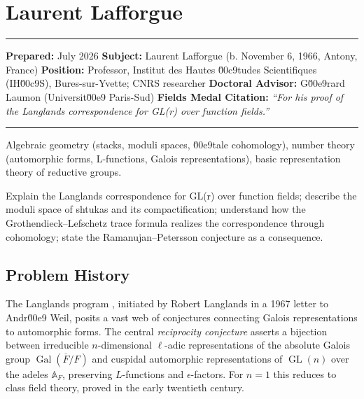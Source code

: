 \chapter{Laurent Lafforgue}\label{ch2002laurentlafforgue:laurent-lafforgue-fields-medal-2002-a-comprehensive-report-on-his-work-and-impact}

\begin{center}\rule{0.5\linewidth}{0.5pt}\end{center}

\textbf{Prepared:} July 2026 \textbf{Subject:} Laurent Lafforgue (b. November 6, 1966, Antony, France) \textbf{Position:} Professor, Institut des Hautes \u00c9tudes Scientifiques (IH\u00c9S), Bures-sur-Yvette; CNRS researcher \textbf{Doctoral Advisor:} G\u00e9rard Laumon (Universit\u00e9 Paris-Sud) \textbf{Fields Medal Citation:} \emph{``For his proof of the Langlands correspondence for GL(r) over function fields.''}

\begin{center}\rule{0.5\linewidth}{0.5pt}\end{center}

\begin{prereqs} Algebraic geometry (stacks, moduli spaces, \u00e9tale cohomology), number theory (automorphic forms, L-functions, Galois representations), basic representation theory of reductive groups. \end{prereqs}

\begin{objectives} Explain the Langlands correspondence for GL(r) over function fields; describe the moduli space of shtukas and its compactification; understand how the Grothendieck--Lefschetz trace formula realizes the correspondence through cohomology; state the Ramanujan--Petersson conjecture as a consequence. \end{objectives}

\section{Problem History}

The Langlands program \cite{lafforgue2002}, initiated by Robert Langlands in a 1967 letter to Andr\u00e9 Weil, posits a vast web of conjectures connecting Galois representations to automorphic forms. The central \emph{reciprocity conjecture} asserts a bijection between irreducible $n$-dimensional $\ell$-adic representations of the absolute Galois group $\operatorname{Gal}(\overline{F}/F)$ and cuspidal automorphic representations of $\operatorname{GL}(n)$ over the adeles $\mathbb{A}_F$, preserving $L$-functions and $\epsilon$-factors. For $n=1$ this reduces to class field theory, proved in the early twentieth century.

